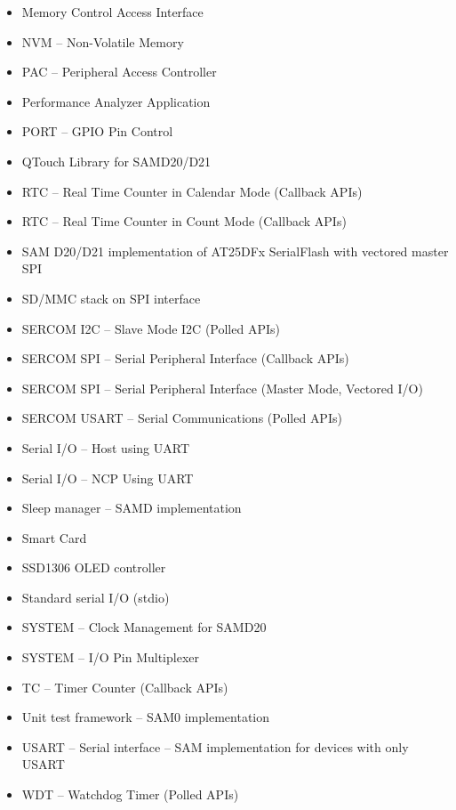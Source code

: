 \begin{multicols}{2}
\begin{flushleft}
\begin{itemize}
			\item Memory Control Access Interface
			\item NVM -- Non-Volatile Memory
			\item PAC -- Peripheral Access Controller
			\item Performance Analyzer Application
			\item PORT -- GPIO Pin Control
			\item QTouch Library for SAMD20/D21
			\item RTC -- Real Time Counter in Calendar Mode (Callback \ac{API}s)
			\item RTC -- Real Time Counter in Count Mode (Callback \ac{API}s)
			\item SAM D20/D21 implementation of AT25DFx SerialFlash with vectored master SPI
			\item SD/MMC stack on SPI interface
			\item SERCOM I2C -- Slave Mode I2C (Polled \ac{API}s)
			\item SERCOM SPI -- Serial Peripheral Interface (Callback \ac{API}s)
			\item SERCOM SPI -- Serial Peripheral Interface (Master Mode, Vectored I/O)
			\item SERCOM USART -- Serial Communications (Polled \ac{API}s)
			\item Serial I/O -- Host using UART
			\item Serial I/O -- NCP Using UART
			\item Sleep manager -- SAMD implementation
			\item Smart Card
			\item SSD1306 OLED controller
			\item Standard serial I/O (stdio)
			\item SYSTEM -- Clock Management for SAMD20
			\item SYSTEM -- I/O Pin Multiplexer
			\item TC -- Timer Counter (Callback \ac{API}s)
			\item Unit test framework -- SAM0 implementation
			\item USART -- Serial interface -- SAM implementation for devices with only USART
			\item WDT -- Watchdog Timer (Polled \ac{API}s)
		\end{itemize}
	\end{flushleft}
\end{multicols}

